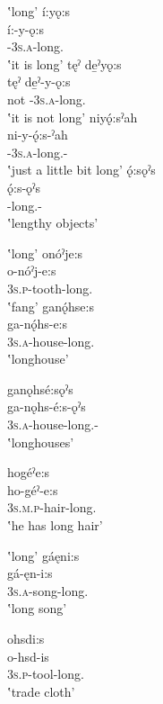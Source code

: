\ea\label{ex:longex1}  ‛long'
\ea í:yǫ:s \\
\gll í:-y-ǫ:s\\
\textsc{{\prothetic}-3s.a}-long.{\stative}\\
\glt ‛it is long'
\newpage
\ex tęˀ de̱ˀyǫ:s\\
\gll tęˀ de̱ˀ-y-ǫ:s\\ 
not \textsc{{\negative}-3s.a}-long.{\stative}\\
\glt ‛it is not long'
\ex niyǫ́:sˀah\\
\gll ni-y-ǫ́:s-ˀah\\
\textsc{{\partitive}-3s.a}-long.{\stative}-{\diminutive}\\
\glt ‛just a little bit long'
\ex ǫ́:sǫˀs\\
\gll ǫ́:s-ǫˀs\\
{\noprefix}-long.{\stative}-{\plural}\\
\glt ‛lengthy objects'
\z
\z

\ea\label{ex:longex2}  ‛long'
\ea onóˀje:s\\
\gll o-nóˀj-e:s\\
\textsc{3s.p}-tooth-long.{\stative}\\
\glt ‛fang'
\ex ganǫ́hse:s\\
\gll ga-nǫ́hs-e:s\\
\textsc{3s.a}-house-long.{\stative}\\
\glt ‛longhouse'

\ex ganǫhsé:sǫˀs\\
\gll ga-nǫhs-é:s-ǫˀs\\
\textsc{3s.a}-house-long.{\stative}-{\plural}\\
\glt ‛longhouses'

\ex hogéˀe:s\\
\gll ho-géˀ-e:s\\
\textsc{3s.m.p}-hair-long.{\stative}\\
\glt ‛he has long hair'

\z
\z

\ea\label{ex:longex3}  ‛long'
\ea gáęni:s\\
\gll gá-ęn-i:s \\
\textsc{3s.a}-song-long.{\stative}\\
\glt ‛long song' 

\newpage
\ex ohsdi:s\\
\gll o-hsd-is\\
\textsc{3s.p}-tool-long.{\stative}\\
\glt ‛trade cloth'

